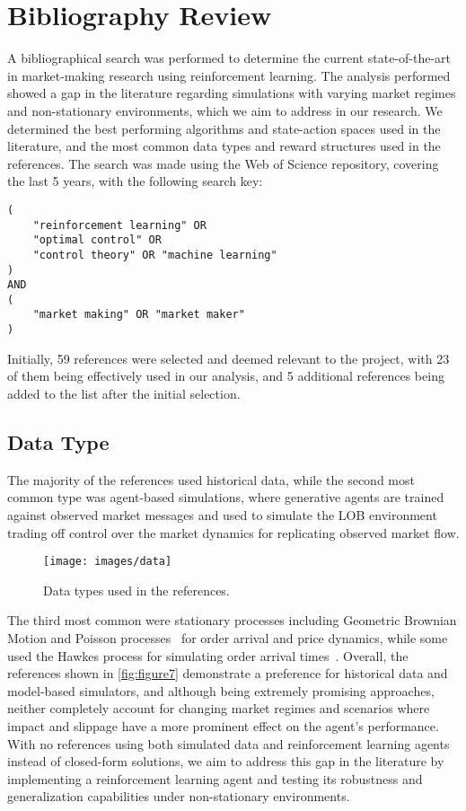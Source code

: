 \section{Bibliography Review}
\label{sec:bibliography-review}

A bibliographical search was performed to determine the current state-of-the-art in market-making research using reinforcement learning.
The analysis performed showed a gap in the literature regarding simulations with varying market regimes and non-stationary environments,
which we aim to address in our research.
We determined the best performing algorithms and state-action spaces used in the literature,
and the most common data types and reward structures used in the references.
The search was made using the Web of Science repository, covering the last 5 years, with the following search key:

\small
\begin{verbatim}
(
    "reinforcement learning" OR
    "optimal control" OR
    "control theory" OR "machine learning"
)
AND
(
    "market making" OR "market maker"
)
\end{verbatim}

Initially, 59 references were selected and deemed relevant to the project,
with 23 of them being effectively used in our analysis, and 5 additional references being added to the list after the initial selection.

\subsection{Data Type}
\label{subsec:data-type}
The majority of the references used historical data, while the second most common type was agent-based simulations,
where generative agents are trained against observed market messages and used to simulate the LOB environment~\cite{Frey2023, Ganesh2019}
trading off control over the market dynamics for replicating observed market flow.

\begin{figure}
    \centering
    \texttt{[image: images/data]}
    \caption{Data types used in the references.}
    \label{fig:figure7}
\end{figure}

The third most common were stationary processes including Geometric Brownian Motion and Poisson processes~\cite{Gasperov2021, Sun2022} for
order arrival and price dynamics, while some used the Hawkes process for simulating order arrival times~\cite{Jerome2022, Selser2021}.
Overall, the references shown in \autoref{fig:figure7} demonstrate a preference for historical data and model-based simulators,
and although being extremely promising approaches, neither completely account for changing market regimes and scenarios where impact and
slippage have a more prominent effect on the agent's performance.
With no references using both simulated data and reinforcement learning agents instead of closed-form solutions,
we aim to address this gap in the literature by implementing a reinforcement learning agent and testing its robustness and generalization capabilities under non-stationary environments.

